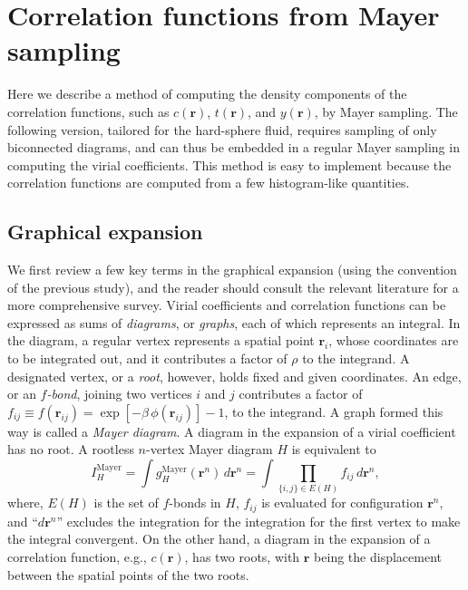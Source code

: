\documentclass[aip,jcp,preprint,superscriptaddress,showpacs,preprintnumbers,amsmath,amssymb]{revtex4-1}
\numberwithin{equation}{section}
\newcommand{\vct}[1]{\mathbf{#1}}
\providecommand{\vr}{} %
\renewcommand{\vr}{\vct{r}}
\begin{document}
\section{\label{sec:cr_mayer}
Correlation functions from Mayer sampling}





Here we describe a method of computing the density components
of the correlation functions\cite{
perera2009, *dennison2009},
such as $c(\vr)$, $t(\vr)$, and $y(\vr)$,
by Mayer sampling\cite{
ree1966, rast1999, *labik2003, *kolafa2006, *kwak2005}.
%
The following version,
tailored for the hard-sphere fluid,
requires sampling of only biconnected diagrams,
and can thus be embedded in a regular Mayer sampling
in computing the virial coefficients\cite{zhang2014}.
%
This method is easy to implement
because the correlation functions
are computed from a few histogram-like quantities.




\subsection{\label{sec:cr_mayer_graphs}
Graphical expansion}




We first review a few key terms
in the graphical expansion
(using the convention of the previous study\cite{zhang2014}),
%
and the reader should consult
the relevant literature\cite{
uhlenbeck1962, hansen, ree1966, zhang2014,
morita1961III, *singh2004,
ree1964a, ree1964c, clisby2006, wheatley2013}
for a more comprehensive survey.
%
Virial coefficients and correlation functions
can be expressed as sums of \emph{diagrams}, or \emph{graphs},
each of which represents an integral.
%
In the diagram,
a regular vertex represents a spatial point $\vr_i$,
whose coordinates are to be integrated out,
and it contributes a factor of $\rho$ to the integrand.
%
A designated vertex,
or a \emph{root},
however, holds fixed and given coordinates.
%
An edge, or an \emph{$f$-bond},
joining two vertices $i$ and $j$
contributes a factor of
$f_{ij} \equiv f(\vr_{ij}) = \exp[-\beta \, \phi(\vr_{ij})] - 1$,
to the integrand.
%
A graph formed this way is called a \emph{Mayer diagram}.
%
A diagram in the expansion of a virial coefficient
has no root.
%
A rootless $n$-vertex Mayer diagram $H$ is equivalent to
%
\[
  I_H^\mathrm{Mayer}
=
\int g_H^\mathrm{Mayer}(\vr^n) \, d\vr^n
=
\int \prod_{ \{i,j\} \in E(H) } f_{ij} \, d\vr^n,
\]
%
where,
$E(H)$
is the set of $f$-bonds in $H$,
%
$f_{ij}$ is evaluated for configuration $\vr^n$,
and
``$d\vr^n$''
excludes the integration for the integration
for the first vertex to make the integral convergent.
%
On the other hand,
a diagram in the expansion of a correlation function,
e.g., $c(\vr)$, has two roots,
with $\vr$ being the displacement between the spatial points
of the two roots.
\end{document}
